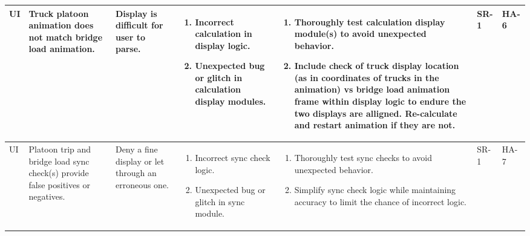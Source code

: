 \documentclass{article}
\begin{document}
\begin{landscape}
\begin{longtable}{|p{} | p{} | p{} | p{} | p{} | p{} | p{}|}
  UI & Truck platoon animation does not match bridge load animation. &
  Display is difficult for user to parse. &
  \begin{enumerate}[leftmargin=*, label={\alph*.}, itemsep=1pt, topsep=0pt, partopsep=0pt] 
    \item Incorrect calculation in display logic.
    \item Unexpected bug or glitch in calculation display modules.
  \end{enumerate} &
  \begin{enumerate}[leftmargin=*, label={\alph*.}, itemsep=1pt, topsep=0pt, partopsep=0pt] 
    \item Thoroughly test calculation display module(s) to avoid unexpected behavior.
    \item Include check of truck display location (as in coordinates of trucks in the animation) vs bridge load animation frame within display logic to endure the two displays are alligned. Re-calculate and restart animation if they are not.
  \end{enumerate} &
  SR-1 & HA-6 \\

  \hline

  UI & Platoon trip and bridge load sync check(s) provide false positives or negatives. & 
  Deny a fine display or let through an erroneous one. & 
  \begin{enumerate}[leftmargin=*, label={\alph*.}, itemsep=1pt, topsep=0pt, partopsep=0pt] 
    \item Incorrect sync check logic.
    \item Unexpected bug or glitch in sync module.
  \end{enumerate} & 
  \begin{enumerate}[leftmargin=*, label={\alph*.}, itemsep=1pt, topsep=0pt, partopsep=0pt] 
    \item Thoroughly test sync checks to avoid unexpected behavior.
    \item Simplify sync check logic while maintaining accuracy to limit the chance of incorrect logic.
  \end{enumerate} &
  SR-1 & HA-7 \\

  \hline
  

\end{longtable}
\end{landscape}
\end{document}
